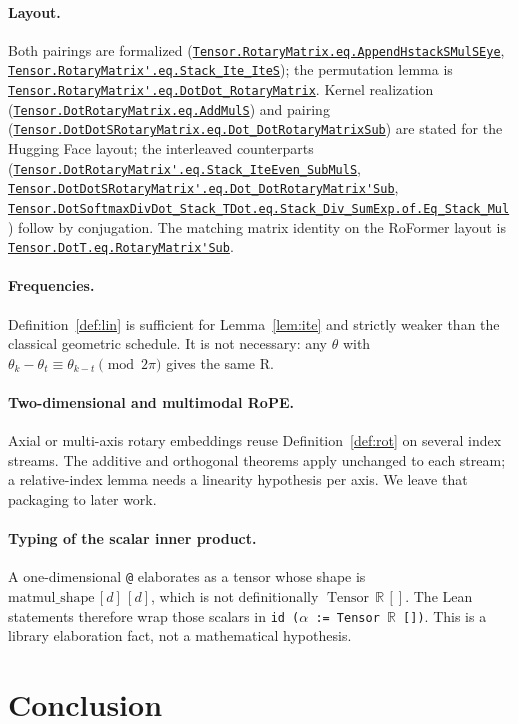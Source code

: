 \documentclass[11pt,a4paper]{article}
\newcommand{\lmod}[1]{\href{http://www.lemma.cn/lean/?module=#1}{\nolinkurl{#1}}}
\newcommand{\R}{\mathbb{R}}
\newcommand{\Tensor}{\operatorname{Tensor}}
\newcommand{\rot}{\mathrm{R}}
\begin{document}
\paragraph{Layout.}
Both pairings are formalized (\lmod{Tensor.RotaryMatrix.eq.AppendHstackSMulSEye}, \lmod{Tensor.RotaryMatrix'.eq.Stack_Ite_IteS}); the permutation lemma is \lmod{Tensor.RotaryMatrix'.eq.DotDot_RotaryMatrix}.
Kernel realization (\lmod{Tensor.DotRotaryMatrix.eq.AddMulS}) and pairing (\lmod{Tensor.DotDotSRotaryMatrix.eq.Dot_DotRotaryMatrixSub}) are stated for the Hugging Face layout; the interleaved counterparts (\lmod{Tensor.DotRotaryMatrix'.eq.Stack_IteEven_SubMulS}, \lmod{Tensor.DotDotSRotaryMatrix'.eq.Dot_DotRotaryMatrix'Sub}, \lmod{Tensor.DotSoftmaxDivDot_Stack_TDot.eq.Stack_Div_SumExp.of.Eq_Stack_Mul}) follow by conjugation.
The matching matrix identity on the RoFormer layout is \lmod{Tensor.DotT.eq.RotaryMatrix'Sub}.

\paragraph{Frequencies.}
Definition~\ref{def:lin} is sufficient for Lemma~\ref{lem:ite} and strictly weaker than the classical geometric schedule.
It is not necessary: any \(\theta\) with
\(\theta_k-\theta_t\equiv\theta_{k-t}\pmod{2\pi}\)
gives the same \(\rot\).

\paragraph{Two-dimensional and multimodal RoPE.}
Axial or multi-axis rotary embeddings reuse Definition~\ref{def:rot} on several index streams.
The additive and orthogonal theorems apply unchanged to each stream; a relative-index lemma needs a linearity hypothesis per axis.
We leave that packaging to later work.

\paragraph{Typing of the scalar inner product.}
A one-dimensional \texttt{@} elaborates as a tensor whose shape is
\(\mathrm{matmul\_shape}\,[d]\,[d]\),
which is not definitionally \(\Tensor\,\R\,[]\).
The Lean statements therefore wrap those scalars in
\texttt{id ($\alpha$ := Tensor \(\R\) [])}.
This is a library elaboration fact, not a mathematical hypothesis.

\section{Conclusion}
\label{sec:conclusion}
\end{document}
